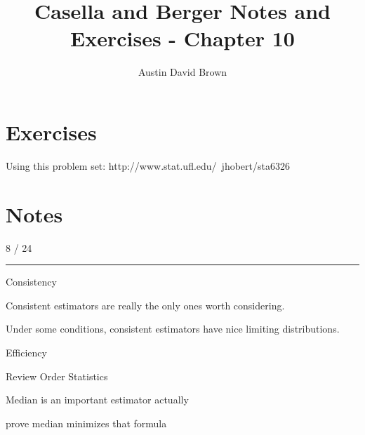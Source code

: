 \documentclass[12pt, reqno]{amsart}
\numberwithin{equation}{section}
\begin{document}
\title{Casella and Berger Notes and Exercises -  Chapter 10}
\author{Austin David Brown}
\maketitle

\section*{Exercises}

Using this problem set:
http://www.stat.ufl.edu/~jhobert/sta6326

\section*{Notes}

8 / 24
\rule{\textwidth}{.5pt}

Consistency

Consistent estimators are really the only ones worth considering.

Under some conditions, consistent estimators have nice limiting distributions.

Efficiency

Review Order Statistics

Median is an important estimator actually

prove median minimizes that formula
\end{document}
